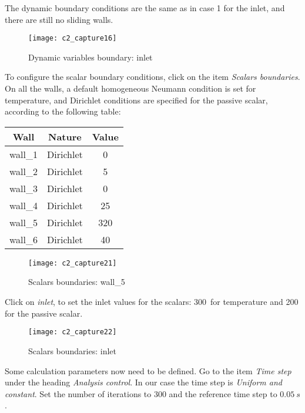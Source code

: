 \newpage
The dynamic boundary conditions are the same as in case 1 for the inlet, and
there are still no sliding walls.


\begin{figure}[h!]
\begin{center}
\texttt{[image: c2\_capture16]}
\caption{Dynamic variables boundary: inlet}
\label{fig16_e2}
\end{center}
\end{figure}


\newpage
To configure the scalar boundary conditions, click on the item
{\itshape Scalars boundaries}.
On all the walls, a default homogeneous Neumann condition is set for
temperature, and Dirichlet conditions are specified for the passive scalar,
according to the following table:
\begin{center}
\begin{tabular}{|c|c|c|}
\hline
Wall & Nature & Value \\
\hline
wall\_1 & Dirichlet  & 0 \\
\hline
wall\_2 & Dirichlet  & 5 \\
\hline
wall\_3 & Dirichlet  & 0 \\
\hline
wall\_4 & Dirichlet  & 25 \\
\hline
wall\_5 & Dirichlet  & 320 \\
\hline
wall\_6 & Dirichlet  & 40 \\
\hline
\end{tabular}
\end{center}

\begin{figure}[h!]
\begin{center}
\texttt{[image: c2\_capture21]}
\caption{Scalars boundaries: wall\_5}
\label{fig21_e2}
\end{center}
\end{figure}


\newpage
Click on {\itshape inlet}, to set the inlet values for the scalars: 300\degresC\
for temperature and 200 for the passive scalar.

\begin{figure}[h!]
\begin{center}
\texttt{[image: c2\_capture22]}
\caption{Scalars boundaries: inlet}
\label{fig22_e2}
\end{center}
\end{figure}


\newpage
Some calculation parameters now need to be defined.
Go to the item {\itshape Time step} under the heading
{\itshape Analysis control}. In our case the time step is
{\itshape Uniform and constant}. Set the number of iterations to 300 and the
reference time step to $0.05\ s$.

